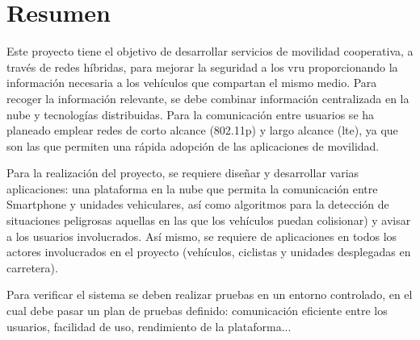 \chapter*{Resumen}
Este proyecto tiene el objetivo de desarrollar servicios de movilidad cooperativa, a través de
redes híbridas, para mejorar la seguridad a los \gls{vru} proporcionando la información necesaria
a los vehículos que compartan el mismo medio. Para recoger la información relevante, se debe combinar
información centralizada en la nube y tecnologías distribuidas. Para la comunicación entre usuarios se
ha planeado emplear redes de corto alcance (\Gls{802.11p}) y largo alcance (\gls{lte}),
ya que son las que permiten una rápida adopción de las aplicaciones de movilidad.

Para la realización del proyecto, se requiere diseñar y desarrollar varias aplicaciones: una plataforma
en la nube que permita la comunicación entre Smartphone y unidades vehiculares, así como algoritmos para
la detección de situaciones peligrosas aquellas en las que los vehículos puedan colisionar) y avisar a
los usuarios involucrados. Así mismo, se requiere de aplicaciones en todos los actores involucrados en
el proyecto (vehículos, ciclistas y unidades desplegadas en carretera).

Para verificar el sistema se deben realizar pruebas en un entorno controlado, en el cual debe pasar un
plan de pruebas definido: comunicación eficiente entre los usuarios, facilidad de uso, rendimiento de
la plataforma...



